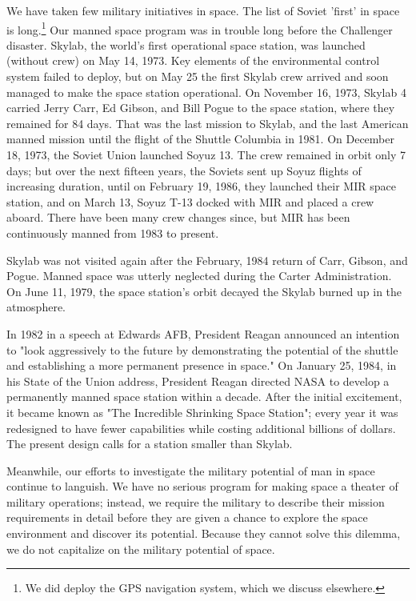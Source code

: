 We have taken few military initiatives in space. The list of Soviet 'first' in space is long.\footnote{
We did deploy the GPS navigation system, which we discuss elsewhere.
}  Our manned space program was in trouble long before the Challenger disaster. Skylab, the world's first operational space station, was launched (without crew) on May 14, 1973. Key elements of the environmental control system failed to deploy, but on May 25 the first Skylab crew arrived and soon managed to make the space station operational. On November 16, 1973, Skylab 4 carried Jerry Carr, Ed Gibson, and Bill Pogue to the space station, where they remained for 84 days. That was the last mission to Skylab, and the last American manned mission until the flight of the Shuttle Columbia in 1981. On December 18, 1973, the Soviet Union launched Soyuz 13. The crew remained in orbit only 7 days; but over the next fifteen years, the Soviets sent up Soyuz flights of increasing duration, until on February 19, 1986, they launched their MIR space station, and on March 13, Soyuz T-13 docked with MIR and placed a crew aboard. There have been many crew changes since, but MIR has been continuously manned from 1983 to present.

Skylab was not visited again after the February, 1984 return of Carr, Gibson, and Pogue. Manned space was utterly neglected during the Carter Administration. On June 11, 1979, the space station's orbit decayed the Skylab burned up in the atmosphere.

In 1982 in a speech at Edwards AFB, President Reagan announced an intention to "look aggressively to the future by demonstrating the potential of the shuttle and establishing a more permanent presence in space." On January 25, 1984, in his State of the Union address, President Reagan directed NASA to develop a permanently manned space station within a decade. After the initial excitement, it became known as "The Incredible Shrinking Space Station"; every year it was redesigned to have fewer capabilities while costing additional billions of dollars. The present design calls for a station smaller than Skylab.

Meanwhile, our efforts to investigate the military potential of man in space continue to languish. We have no serious program for making space a theater of military operations; instead, we require the military to describe their mission requirements in detail before they are given a chance to explore the space environment and discover its potential. Because they cannot solve this dilemma, we do not capitalize on the military potential of space.

